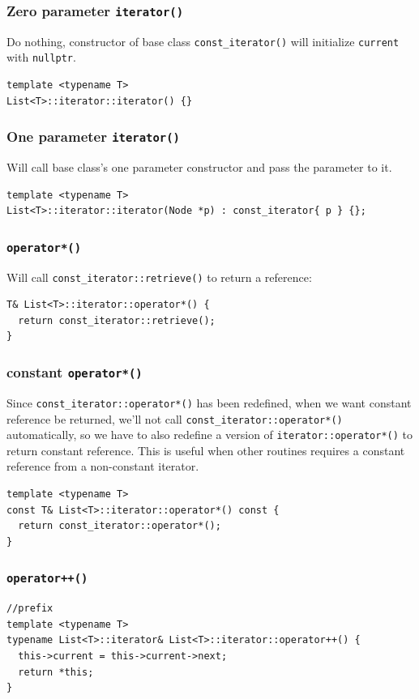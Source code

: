 \documentclass[12pt]{book}
\begin{document}
\subsubsection{Zero parameter \texttt{iterator()}}
\label{sec:org1335f48}
Do nothing, constructor of base class \texttt{const\_iterator()} will initialize \texttt{current} with \texttt{nullptr}.
\begin{verbatim}
template <typename T>
List<T>::iterator::iterator() {}
\end{verbatim}
\subsubsection{One parameter \texttt{iterator()}}
\label{sec:orgfeaaedd}
Will call base class's one parameter constructor and pass the parameter to it.
\begin{verbatim}
template <typename T>
List<T>::iterator::iterator(Node *p) : const_iterator{ p } {};
\end{verbatim}
\subsubsection{\texttt{operator*()}}
\label{sec:org4aa48c4}
Will call \texttt{const\_iterator::retrieve()} to return a reference:
\begin{verbatim}
T& List<T>::iterator::operator*() {
  return const_iterator::retrieve();
}
\end{verbatim}
\subsubsection{constant \texttt{operator*()}}
\label{sec:org5dd6a7c}
Since \texttt{const\_iterator::operator*()} has been redefined, when we want constant reference be returned, we'll not call \texttt{const\_iterator::operator*()} automatically, so we have to also redefine a version of \texttt{iterator::operator*()} to return constant reference. This is useful when other routines requires a constant reference from a non-constant iterator.
\begin{verbatim}
template <typename T>
const T& List<T>::iterator::operator*() const {
  return const_iterator::operator*();
}
\end{verbatim}
\subsubsection{\texttt{operator++()}}
\label{sec:orgd9de5c6}
\begin{verbatim}
//prefix
template <typename T>
typename List<T>::iterator& List<T>::iterator::operator++() {
  this->current = this->current->next;
  return *this;
}
\end{verbatim}
\end{document}
